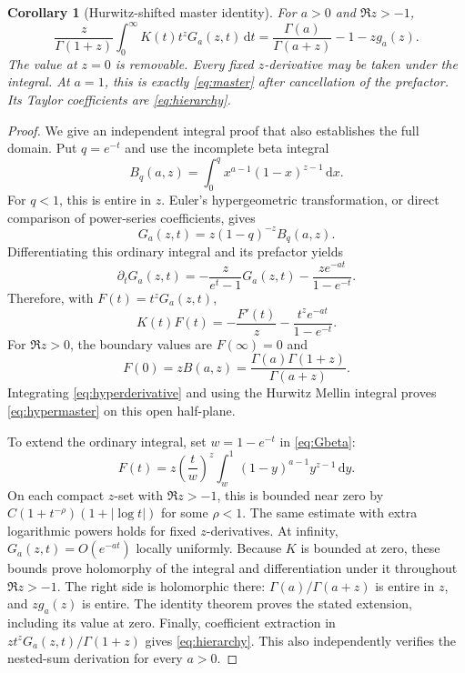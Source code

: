 \documentclass[11pt,a4paper]{article}
\numberwithin{equation}{section}
\newtheorem{corollary}[theorem]{Corollary}
\theoremstyle{definition}\newtheorem{definition}[theorem]{Definition}
\theoremstyle{remark}\newtheorem{remark}[theorem]{Remark}
\newcommand{\dd}{\,\mathrm d}
\begin{document}
\begin{corollary}[Hurwitz-shifted master identity]\label{cor:hyper}
For $a>0$ and $\Re z>-1$,
\begin{equation}\label{eq:hypermaster}
 \boxed{\displaystyle
 \frac z{\Gamma(1+z)}\int_0^\infty K(t)t^z G_a(z,t)\dd t
      =\frac{\Gamma(a)}{\Gamma(a+z)}-1-zg_a(z).}
\end{equation}
The value at $z=0$ is removable. Every fixed $z$-derivative may be
taken under the integral. At $a=1$, this is exactly \eqref{eq:master}
after cancellation of the prefactor. Its Taylor coefficients are
\eqref{eq:hierarchy}.
\end{corollary}
\begin{proof}
We give an independent integral proof that also establishes the full
domain. Put $q=e^{-t}$ and use the incomplete beta integral
\[
 B_q(a,z)=\int_0^q x^{a-1}(1-x)^{z-1}\dd x.
\]
For $q<1$, this is entire in $z$. Euler's hypergeometric transformation,
or direct comparison of power-series coefficients, gives
\begin{equation}\label{eq:Gbeta}
 G_a(z,t)=z(1-q)^{-z}B_q(a,z).
\end{equation}
Differentiating this ordinary integral and its prefactor yields
\[
 \partial_tG_a(z,t)=-\frac{z}{e^t-1}G_a(z,t)
                        -\frac{z e^{-at}}{1-e^{-t}}.
\]
Therefore, with $F(t)=t^zG_a(z,t)$,
\begin{equation}\label{eq:hyperderivative}
 K(t)F(t)=-\frac{F'(t)}z-\frac{t^ze^{-at}}{1-e^{-t}}.
\end{equation}
For $\Re z>0$, the boundary values are $F(\infty)=0$ and
\[
 F(0)=zB(a,z)=\frac{\Gamma(a)\Gamma(1+z)}{\Gamma(a+z)}.
\]
Integrating \eqref{eq:hyperderivative} and using the Hurwitz Mellin
integral proves \eqref{eq:hypermaster} on this open half-plane.

To extend the ordinary integral, set $w=1-e^{-t}$ in \eqref{eq:Gbeta}:
\[
 F(t)=z\left(\frac{t}{w}\right)^z
       \int_w^1 (1-y)^{a-1}y^{z-1}\dd y.
\]
On each compact $z$-set with $\Re z>-1$, this is bounded near zero by
$C(1+t^{-\rho})(1+|\log t|)$ for some $\rho<1$. The same estimate
with extra logarithmic powers holds for fixed $z$-derivatives. At
infinity, $G_a(z,t)=O(e^{-at})$ locally uniformly. Because $K$ is bounded
at zero, these bounds prove holomorphy of the integral and differentiation
under it throughout $\Re z>-1$. The right side is holomorphic there:
$\Gamma(a)/\Gamma(a+z)$ is entire in $z$, and $zg_a(z)$ is entire.
The identity theorem proves the stated extension, including its value
at zero. Finally, coefficient extraction in
$z t^zG_a(z,t)/\Gamma(1+z)$ gives \eqref{eq:hierarchy}. This also
independently verifies the nested-sum derivation for every $a>0$.
\end{proof}
\end{document}
